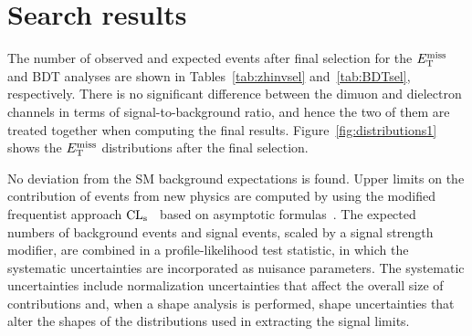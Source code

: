 \section{Search results}
\label{sec:dmresults}
The number of observed and expected events after final selection for the $E_\mathrm{T}^{\mathrm{miss}}$ and BDT analyses are shown in Tables~\ref{tab:zhinvsel} and~\ref{tab:BDTsel}, respectively. 
There is no significant difference between the dimuon and dielectron channels 
in terms of signal-to-background ratio, and hence the two of them 
are treated together when computing the final results. 
Figure~\ref{fig:distributions1} shows the $E_\mathrm{T}^{\mathrm{miss}}$
distributions after the final selection.

No deviation from the SM background expectations is found.
Upper limits on the contribution of events from new physics are
computed by using the modified frequentist approach
$\text{CL}_\text{s}$~\cite{Read1,junkcls} based on asymptotic
formulas~\cite{Cowan:2010js}. 
The expected numbers of background events and signal events, scaled by
a signal strength modifier, are combined in a profile-likelihood test 
statistic, in which the systematic uncertainties are incorporated as
nuisance parameters. 
The systematic uncertainties include normalization uncertainties that
affect the overall size of contributions and, when a shape analysis is
performed, shape uncertainties that alter the shapes of the
distributions used in extracting the signal limits. 


